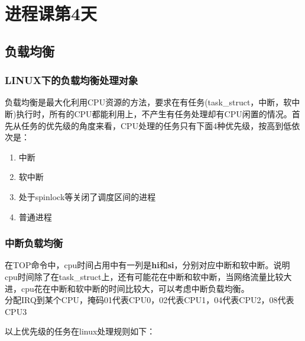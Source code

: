 


\part{进程课第4天}


\chapter{负载均衡}
\section{LINUX下的负载均衡处理对象}
负载均衡是最大化利用CPU资源的方法，要求在有任务(task\_struct，中断，软中断)执行时，所有的CPU都能利用上，不产生有任务处理却有CPU闲置的情况。首先从任务的优先级的角度来看，CPU处理的任务只有下面4种优先级，按高到低依次是：

\begin{enumerate}
  \item 中断
  \item 软中断
  \item 处于spinlock等关闭了调度区间的进程
  \item 普通进程
\end{enumerate}

\section{中断负载均衡}
在TOP命令中，cpu时间占用中有一列是\textbf{hi}和\textbf{si}，分别对应中断和软中断。说明cpu时间除了在task\_struct上，还有可能花在中断和软中断，当网络流量比较大进，cpu花在中断和软中断的时间比较大，可以考虑中断负载均衡。\\

分配IRQ到某个CPU，掩码01代表CPU0，02代表CPU1，04代表CPU2，08代表CPU3


以上优先级的任务在linux处理规则如下：

